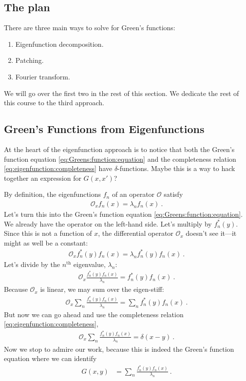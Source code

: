 \documentclass[12pt]{article}
\numberwithin{equation}{section}    %
\begin{document}
\subsection{The plan}

There are three main ways to solve for Green’s functions:
\begin{enumerate}     
  \item Eigenfunction decomposition.
  \item Patching.
  \item Fourier transform.
\end{enumerate}   
We will go over the first two in the rest of this section. We dedicate the rest of this course to the third approach.

\subsection{Green’s Functions from Eigenfunctions}

At the heart of the eigenfunction approach is to notice that both the Green’s function equation \eqref{eq:Greens:function:equation} and the completeness relation \eqref{eq:eigenfunction:completeness} have $\delta$-functions. Maybe this is a way to hack together an expression for $G(x,x')$?

By definition, the eigenfunctions $f_n$ of an operator $\mathcal O$ satisfy
\begin{align}
  \mathcal O_x f_n(x) = \lambda_n f_n(x) \ .
\end{align}
Let’s turn this into the Green’s function equation \eqref{eq:Greens:function:equation}. We already have the operator on the left-hand side. Let’s multiply by $f_n^*(y)$. Since this is not a function of $x$, the differential operator $\mathcal O_x$ doesn’t see it---it might as well be a constant:
\begin{align}
  \mathcal O_x f_n^*(y) f_n(x) = \lambda_n f_n^*(y) f_n(x) \ .
\end{align}
Let’s divide by the $n^\text{th}$ eigenvalue, $\lambda_n$:
\begin{align}
  \mathcal O_x \frac{f_n^*(y) f_n(x)}{\lambda_n} =  f_n^*(y) f_n(x) \ .
\end{align}
Because $\mathcal O_x$ is linear, we may sum over the eigen-stiff:
\begin{align}
  \mathcal O_x \sum_n \frac{f_n^*(y) f_n(x)}{\lambda_n} =   \sum_n f_n^*(y) f_n(x) \ .
\end{align}
But now we can go ahead and use the completeness relation \eqref{eq:eigenfunction:completeness},
\begin{align}
  \mathcal O_x \sum_n \frac{f_n^*(y) f_n(x)}{\lambda_n} =   \delta(x-y) \ .
\end{align}
Now we stop to admire our work, because this is indeed the Green’s function equation where we can identify
\begin{align}
  G(x,y) &= \sum_n \frac{f_n^*(y) f_n(x)}{\lambda_n} \ .
\end{align}
\end{document}
